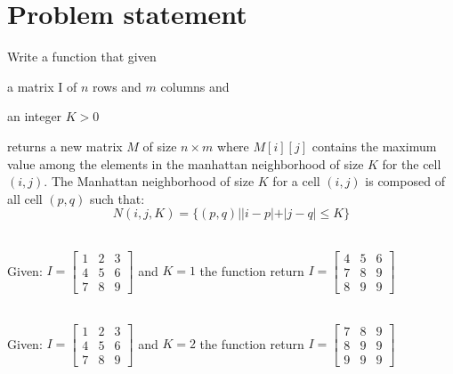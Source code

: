 \section{Problem statement}
\begin{exercise}
\label{example:max_manhattan:exercice1}
Write a function that given \begin{enumerate*}
	\item a matrix I of $n$ rows and $m$ columns and
	\item  an integer $K > 0$
\end{enumerate*}
returns a new matrix $M$ of size $n \times m$ where $M[i][j]$ contains the maximum value among the
elements in the manhattan neighborhood of size $K$ for the cell $(i,j)$.
The Manhattan neighborhood of size $K$ for a cell $(i,j)$ is composed of all cell $(p,q)$ such that:
\begin{equation}
	N(i,j, K) = \{(p,q) | |i-p|+|j-q| \leq K\}
	\label{eq:max_manhattan:neighbood_equation}
\end{equation}


\end{exercise}
	\begin{example}
		\label{example:max_manhattan:example1}
		\hfill \\
		Given: $I=
		\begin{bmatrix}
		  1 & 2 & 3  \\
		  4 & 5 & 6  \\
		  7 & 8 & 9  
		\end{bmatrix}
	  $
  and $K=1$ the function return $I=
  \begin{bmatrix}
	  4 & 5 & 6  \\
	  7 & 8 & 9  \\
	  8 & 9 & 9  
	\end{bmatrix}
$
		
	\end{example}

	\begin{example}
		\label{example:max_manhattan:example2}
		\hfill \\
		Given: $I=
		\begin{bmatrix}
		  1 & 2 & 3  \\
		  4 & 5 & 6  \\
		  7 & 8 & 9  
		\end{bmatrix}
	  $
  and $K=2$ the function return $I=
  \begin{bmatrix}
	  7 & 8 & 9  \\
	  8 & 9 & 9  \\
	  9 & 9 & 9  
	\end{bmatrix}
$
		
	\end{example}




